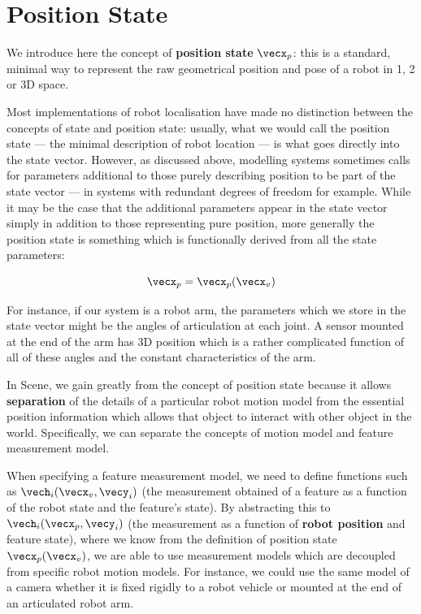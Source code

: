 \documentclass{article}
\begin{document}
\section{Position State}

We introduce here the concept of {\bf position state} $\vecx_p$: this
is a standard, minimal way to represent the raw geometrical position
and pose of a robot in 1, 2 or 3D space.

Most implementations of robot localisation have made no distinction
between the concepts of state and position state: usually, what we
would call the position state --- the minimal description of robot
location --- is what goes directly into the state vector.  However, as
discussed above, modelling systems sometimes calls for parameters
additional to those purely describing position to be part of the state
vector --- in systems with redundant degrees of freedom for example.
While it may be the case that the additional parameters appear in the
state vector simply in addition to those representing pure position,
more generally the position state is something which is functionally
derived from all the state parameters:

\begin{equation}
  \vecx_p = \vecx_p(\vecx_v)  
\end{equation}

For instance, if our system is a robot arm, the parameters which we
store in the state vector might be the angles of articulation at each
joint. A sensor mounted at the end of the arm has 3D position which is
a rather complicated function of all of these angles and the constant
characteristics of the arm.


In Scene, we gain greatly from the concept of position state because
it allows {\bf separation} of the details of a particular robot motion
model from the essential position information which allows that object
to interact with other object in the world. Specifically, we can
separate the concepts of motion model and feature measurement model.


When specifying a feature measurement model, we need to define
functions such as $\vech_i(\vecx_v, \vecy_i)$ (the measurement
obtained of a feature as a function of the robot state and the
feature's state). By abstracting this to $\vech_i(\vecx_p, \vecy_i)$
(the measurement as a function of {\bf robot position} and feature
state), where we know from the definition of position state
$\vecx_p(\vecx_v)$, we are able to use measurement models which are
decoupled from specific robot motion models. For instance, we could
use the same model of a camera whether it is fixed rigidly to a robot
vehicle or mounted at the end of an articulated robot arm.
\end{document}
